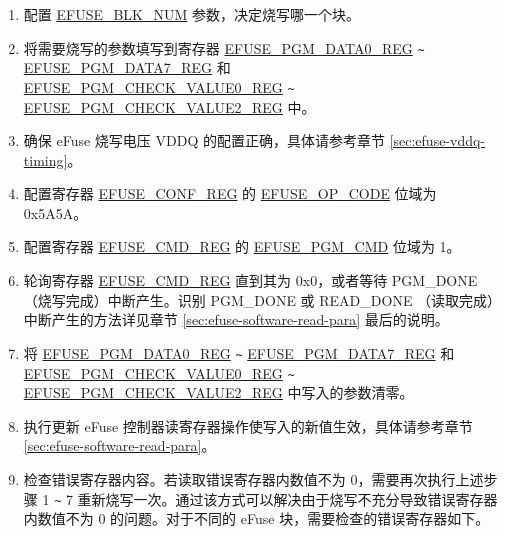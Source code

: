 \documentclass[main\_\_CN.tex]{subfiles}
\begin{document}
\begin{enumerate}
\item 配置 \hyperref[fielddesc:EFUSEBLKNUM]{EFUSE\_BLK\_NUM} 参数，决定烧写哪一个块。

\item 将需要烧写的参数填写到寄存器 \hyperref[regdesc:EFUSEPGMDATANREG]{EFUSE\_PGM\_DATA0\_REG} \verb+~+ \hyperref[regdesc:EFUSEPGMDATANREG]{EFUSE\_PGM\_DATA7\_REG} 和\\ \hyperref[regdesc:EFUSEPGMCHECKVALUENREG]{EFUSE\_PGM\_CHECK\_VALUE0\_REG} \verb+~+  \hyperref[regdesc:EFUSEPGMCHECKVALUENREG]{EFUSE\_PGM\_CHECK\_VALUE2\_REG} 中。

\item 确保 eFuse 烧写电压 VDDQ 的配置正确，具体请参考章节 \ref{sec:efuse-vddq-timing}。

\item 配置寄存器 \hyperref[regdesc:EFUSECONFREG]{EFUSE\_CONF\_REG} 的 \hyperref[fielddesc:EFUSEOPCODE]{EFUSE\_OP\_CODE} 位域为 0x5A5A。

\item 配置寄存器 \hyperref[regdesc:EFUSECMDREG]{EFUSE\_CMD\_REG} 的 \hyperref[fielddesc:EFUSEPGMCMD]{EFUSE\_PGM\_CMD} 位域为 1。

\item 轮询寄存器 \hyperref[regdesc:EFUSECMDREG]{EFUSE\_CMD\_REG} 直到其为 0x0，或者等待 PGM\_DONE（烧写完成）中断产生。识别 PGM\_DONE 或 READ\_DONE （读取完成）中断产生的方法详见章节 \ref{sec:efuse-software-read-para} 最后的说明。

\item 将 \hyperref[regdesc:EFUSEPGMDATANREG]{EFUSE\_PGM\_DATA0\_REG} \verb+~+ \hyperref[regdesc:EFUSEPGMDATANREG]{EFUSE\_PGM\_DATA7\_REG} 和\\ \hyperref[regdesc:EFUSEPGMCHECKVALUENREG]{EFUSE\_PGM\_CHECK\_VALUE0\_REG} \verb+~+  \hyperref[regdesc:EFUSEPGMCHECKVALUENREG]{EFUSE\_PGM\_CHECK\_VALUE2\_REG} 中写入的参数清零。

\item 执行更新 eFuse 控制器读寄存器操作使写入的新值生效，具体请参考章节 \ref{sec:efuse-software-read-para}。
\item 检查错误寄存器内容。若读取错误寄存器内数值不为 0，需要再次执行上述步骤 1 \verb+~+ 7 重新烧写一次。通过该方式可以解决由于烧写不充分导致错误寄存器内数值不为 0 的问题。对于不同的 eFuse 块，需要检查的错误寄存器如下。



\end{enumerate}
\end{document}

